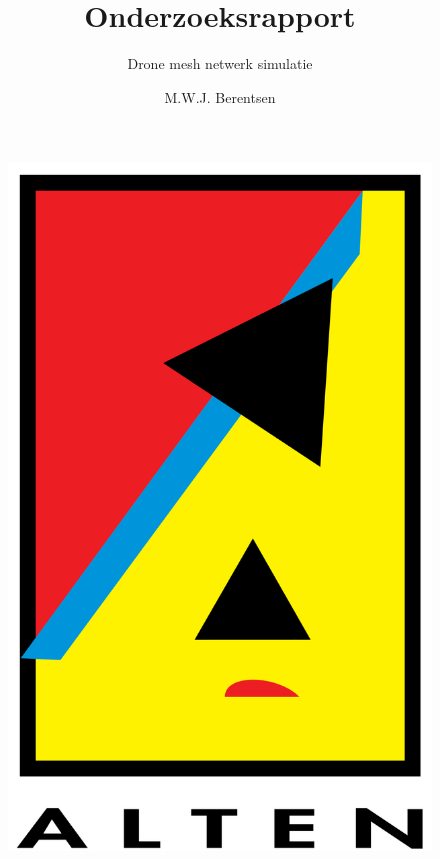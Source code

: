 \documentclass[a4paper, 11pt, oneside]{report}
\author{M.W.J. Berentsen}
\title{Onderzoeksrapport}
\subtitle{Drone mesh netwerk simulatie}{HAN Arnhem}{561399}{MWJ.Berentsen@student.han.nl}{Versie 1}{Alten Nederland B.V.}{Docent: J. Visch, MSc}{Assessor: ir. C.G.R. van Uffelen}
\begin{document}
\begin{figure}
\begin{center}\includegraphics[scale=0.1]{alten}\end{center}
\end{figure}
\maketitle

\end{document}
